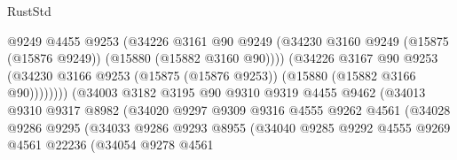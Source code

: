 \begin{lexlean}{RustStd}
\begin{coremodule}
                                      @9249
                                      @4455
                                      @9253
                                      (@34226
                                        @3161
                                        @90
                                        @9249
                                        (@34230
                                          @3160
                                          @9249
                                          (@15875 (@15876 @9249))
                                          (@15880 (@15882 @3160 @90))))
                                      (@34226
                                        @3167
                                        @90
                                        @9253
                                        (@34230
                                          @3166
                                          @9253
                                          (@15875 (@15876 @9253))
                                          (@15880 (@15882 @3166 @90))))))))
                              (@34003
                                @3182
                                @3195
                                @90
                                @9310
                                @9319
                                @4455
                                @9462
                                (@34013
                                  @9310
                                  @9317
                                  @8982
                                  (@34020
                                    @9297
                                    @9309
                                    @9316
                                    @4555
                                    @9262
                                    @4561
                                    (@34028
                                      @9286
                                      @9295
                                      (@34033
                                        @9286
                                        @9293
                                        @8955
                                        (@34040
                                          @9285
                                          @9292
                                          @4555
                                          @9269
                                          @4561
                                          @22236
                                          (@34054
                                            @9278
                                            @4561

\end{coremodule}
\end{lexlean}
